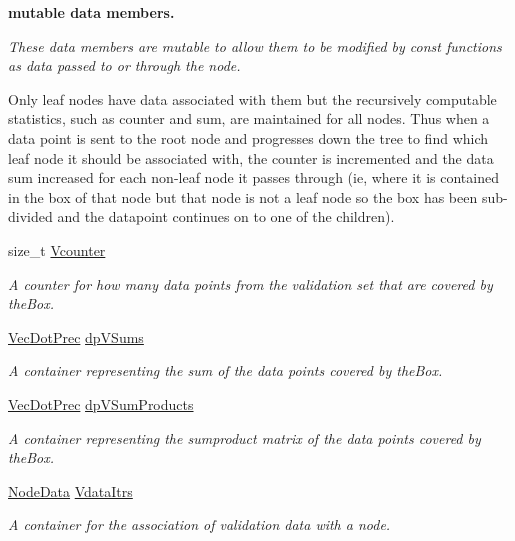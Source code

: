 \begin{Indent}{\bf mutable data members.}\par
{\em \-These data members are mutable to allow them to be modified by const functions as data passed to or through the node.

\-Only leaf nodes have data associated with them but the recursively computable statistics, such as counter and sum, are maintained for all nodes. \-Thus when a data point is sent to the root node and progresses down the tree to find which leaf node it should be associated with, the counter is incremented and the data sum increased for each non-\/leaf node it passes through (ie, where it is contained in the box of that node but that node is not a leaf node so the box has been sub-\/ divided and the datapoint continues on to one of the children). }\begin{DoxyCompactItemize}
\item 
size\-\_\-t \hyperlink{classsubpavings_1_1SPSVnode_a5d0154d5c5d30fa214b8a2d9deedee12}{\-Vcounter}
\begin{DoxyCompactList}\small\item\em \-A counter for how many data points from the validation set that are covered by the\-Box. \end{DoxyCompactList}\item 
\hyperlink{namespacesubpavings_ad8f0a077ee1c4678bcd1868f3aecd605}{\-Vec\-Dot\-Prec} \hyperlink{classsubpavings_1_1SPSVnode_a60f29b9bd7f1a448515c5465e5f7f1ba}{dp\-V\-Sums}
\begin{DoxyCompactList}\small\item\em \-A container representing the sum of the data points covered by the\-Box. \end{DoxyCompactList}\item 
\hyperlink{namespacesubpavings_ad8f0a077ee1c4678bcd1868f3aecd605}{\-Vec\-Dot\-Prec} \hyperlink{classsubpavings_1_1SPSVnode_af35e25f257c98de51097428419d0cf81}{dp\-V\-Sum\-Products}
\begin{DoxyCompactList}\small\item\em \-A container representing the sumproduct matrix of the data points covered by the\-Box. \end{DoxyCompactList}\item 
\hyperlink{namespacesubpavings_af005697b49cff9ea37fc3bc9ed19da30}{\-Node\-Data} \hyperlink{classsubpavings_1_1SPSVnode_a0e6c6ea9c454b9ce280915b59c7f3647}{\-Vdata\-Itrs}
\begin{DoxyCompactList}\small\item\em \-A container for the association of validation data with a node. \end{DoxyCompactList}\end{DoxyCompactItemize}
\end{Indent}
